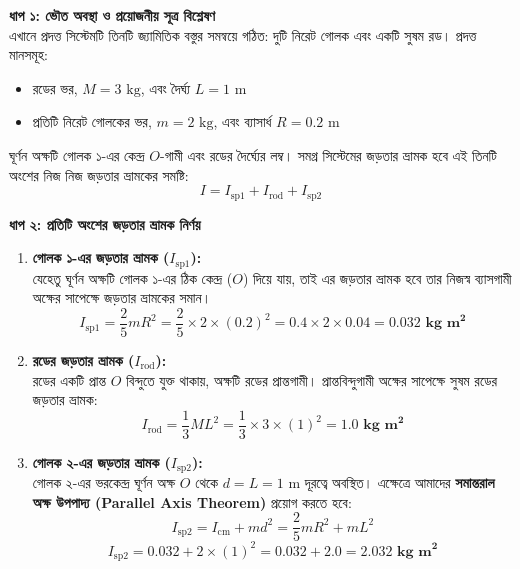 \documentclass[12pt, a4paper]{article}
\begin{document}
\begin{tcolorbox}[solutionbox={সমাধান (Solution)}]
\noindent
\textbf{ধাপ ১: ভৌত অবস্থা ও প্রয়োজনীয় সূত্র বিশ্লেষণ} \\
এখানে প্রদত্ত সিস্টেমটি তিনটি জ্যামিতিক বস্তুর সমন্বয়ে গঠিত: দুটি নিরেট গোলক এবং একটি সুষম রড। 
প্রদত্ত মানসমূহ:
\begin{itemize}[leftmargin=*, parsep=0.5ex]
    \item রডের ভর, $M = 3\text{ kg}$, এবং দৈর্ঘ্য $L = 1\text{ m}$
    \item প্রতিটি নিরেট গোলকের ভর, $m = 2\text{ kg}$, এবং ব্যাসার্ধ $R = 0.2\text{ m}$
\end{itemize}
ঘূর্ণন অক্ষটি গোলক ১-এর কেন্দ্র $O$-গামী এবং রডের দৈর্ঘ্যের লম্ব। 
সমগ্র সিস্টেমের জড়তার ভ্রামক হবে এই তিনটি অংশের নিজ নিজ জড়তার ভ্রামকের সমষ্টি:
\[ I = I_{\text{sp1}} + I_{\text{rod}} + I_{\text{sp2}} \]

\vspace{0.5em}
\noindent
\textbf{ধাপ ২: প্রতিটি অংশের জড়তার ভ্রামক নির্ণয়}
\begin{enumerate}[label=\textbf{\arabic*.}, leftmargin=*, parsep=0.5ex]
    \item \textbf{গোলক ১-এর জড়তার ভ্রামক ($I_{\text{sp1}}$):} \\
    যেহেতু ঘূর্ণন অক্ষটি গোলক ১-এর ঠিক কেন্দ্র ($O$) দিয়ে যায়, তাই এর জড়তার ভ্রামক হবে তার নিজস্ব ব্যাসগামী অক্ষের সাপেক্ষে জড়তার ভ্রামকের সমান।
    \[ I_{\text{sp1}} = \frac{2}{5}mR^2 = \frac{2}{5} \times 2 \times (0.2)^2 = 0.4 \times 2 \times 0.04 = \mathbf{0.032\text{ kg m}^2} \]
    
    \item \textbf{রডের জড়তার ভ্রামক ($I_{\text{rod}}$):} \\
    রডের একটি প্রান্ত $O$ বিন্দুতে যুক্ত থাকায়, অক্ষটি রডের প্রান্তগামী। প্রান্তবিন্দুগামী অক্ষের সাপেক্ষে সুষম রডের জড়তার ভ্রামক:
    \[ I_{\text{rod}} = \frac{1}{3}ML^2 = \frac{1}{3} \times 3 \times (1)^2 = \mathbf{1.0\text{ kg m}^2} \]
    
    \item \textbf{গোলক ২-এর জড়তার ভ্রামক ($I_{\text{sp2}}$):} \\
    গোলক ২-এর ভরকেন্দ্র ঘূর্ণন অক্ষ $O$ থেকে $d = L = 1\text{ m}$ দূরত্বে অবস্থিত। এক্ষেত্রে আমাদের \textbf{সমান্তরাল অক্ষ উপপাদ্য (Parallel Axis Theorem)} প্রয়োগ করতে হবে:
    \[ I_{\text{sp2}} = I_{\text{cm}} + md^2 = \frac{2}{5}mR^2 + mL^2 \]
    \[ I_{\text{sp2}} = 0.032 + 2 \times (1)^2 = 0.032 + 2.0 = \mathbf{2.032\text{ kg m}^2} \]
\end{enumerate}


\end{tcolorbox}
\end{document}
